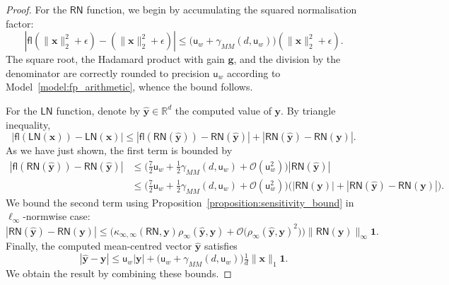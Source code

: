 \documentclass[namedate,webpdf,imanum]{ima-authoring-template}
\newcommand{\Real}{\mathbb{R}}
\newcommand{\Matrix}[1]{\mathbf{#1}}
\newcommand{\Norm}[3][]{#1\| #2 #1\|_{\mathrm{#3}}}
\newcommand{\One}{\Matrix{1}}
\newcommand{\Layer}[1]{\mathsf{#1}}
\newcommand{\dist}[3][]{\rho_{\mathrm{#2}} #1( #3 #1)}
\newcommand{\cond}[3][]{\kappa_{\mathrm{#2}} #1( #3 #1)}
\newcommand{\fl}[2][]{\mathsf{fl}#1( #2 #1)}
\newcommand{\uh}{\mathsf{u}}
\newcommand{\Oh}[2][]{\mathcal{O}#1( #2 #1)}
\numberwithin{equation}{section}
\begin{document}
\begin{proof}
For the $\Layer{RN}$ function, we begin by accumulating the squared normalisation factor:
\begin{equation*}
    | \fl{\Norm{\Matrix{x}}{2}^2 + \epsilon} - (\Norm{\Matrix{x}}{2}^2 + \epsilon) | \leq \big(\uh_{w} + \gamma_{MM}(d,\uh_w)\big) (\Norm{\Matrix{x}}{2}^2 + \epsilon).
\end{equation*}
The square root, the Hadamard product with gain $\Matrix{g}$, and the division by the denominator are correctly rounded to precision $\uh_{w}$ according to Model~\ref{model:fp_arithmetic}, whence the bound follows.

For the $\Layer{LN}$ function, denote by $\Matrix{\hat{y}} \in \Real^d$ the computed value of $\Matrix{y}$.
By triangle inequality,
\begin{equation*}
    | \fl{\Layer{LN}(\Matrix{x})} - \Layer{LN}(\Matrix{x}) | \leq | \fl{\Layer{RN}(\Matrix{\hat{y}})} - \Layer{RN}(\Matrix{\hat{y}}) | + | \Layer{RN}(\Matrix{\hat{y}}) - \Layer{RN}(\Matrix{y}) |.
\end{equation*}
As we have just shown, the first term is bounded by
\begin{align*}
    | \fl{\Layer{RN}(\Matrix{\hat{y}})} - \Layer{RN}(\Matrix{\hat{y}}) | &\leq \Big( \tfrac{7}{2} \uh_{w} + \tfrac{1}{2} \gamma_{MM}(d, \uh_w) + \Oh{\uh_{w}^2} \Big) |\Layer{RN}(\Matrix{\hat{y}})| \\
    &\leq \Big( \tfrac{7}{2} \uh_{w} + \tfrac{1}{2} \gamma_{MM}(d, \uh_w) + \Oh{\uh_{w}^2} \Big) \Big(|\Layer{RN}(\Matrix{y})| + |\Layer{RN}(\Matrix{\hat{y}}) - \Layer{RN}(\Matrix{y})|\Big).
\end{align*}
We bound the second term using Proposition~\ref{proposition:sensitivity_bound} in $\ell_\infty$-normwise case:
\begin{equation*}
    |\Layer{RN}(\Matrix{\hat{y}}) - \Layer{RN}(\Matrix{y})| \leq \Big( \cond{\infty,\infty}{\Layer{RN},\Matrix{y}} \dist{\infty}{\Matrix{\hat{y}}, \Matrix{y}} + \Oh[\big]{\dist{\infty}{\Matrix{\hat{y}}, \Matrix{y}}^2} \Big) \Norm{\Layer{RN}(\Matrix{y})}{\infty} \One.
\end{equation*}
Finally, the computed mean-centred vector $\Matrix{\hat{y}}$ satisfies
\begin{equation*}
    | \Matrix{\hat{y}} - \Matrix{y} | \leq \uh_{w} |\Matrix{y}| + \big( \uh_{w} + \gamma_{MM}(d, \uh_w) \big) \tfrac{1}{d} \Norm{\Matrix{x}}{1} \One.
\end{equation*}
We obtain the result by combining these bounds.
\end{proof}
\end{document}
